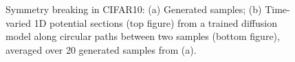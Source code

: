 \begin{figure}[ht!]
\begin{minipage}[b]{.625\textwidth}
\addtocounter{subfigure}{-2}
\end{minipage}
\caption{Symmetry breaking in CIFAR10: (a) Generated samples; (b) Time-varied 1D potential sections (top figure) from a trained diffusion model along circular paths between two samples (bottom figure), averaged over 20 generated samples from (a).}
\label{fig:potentials_cifar10}
\end{figure}


